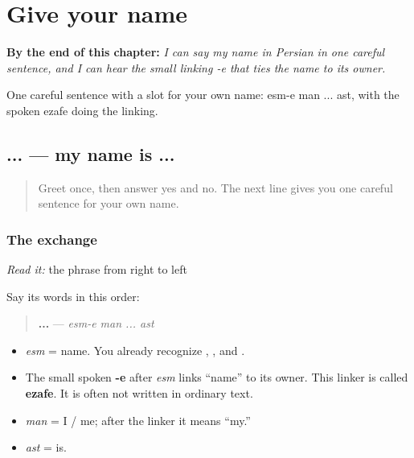 
\chapter{Give your name}
\label{ch:persian-name}

\begin{chapteropening}
\textbf{By the end of this chapter:} \emph{I can say my name in Persian in one careful sentence, and I can hear the small linking -e that ties the name to its owner.}

One careful sentence with a slot for your own name: esm-e man ... ast, with the spoken ezafe doing the linking.
\end{chapteropening}

\section[\texorpdfstring{\fa{اسم} \fa{من} ... \fa{است} (esm-e man ... ast)}{اسم من ... است (esm-e man ... ast)}]{  ...  — my name is ...}

\label{lesson:FA-C02-esm-e-man}



\begin{quote}
Greet once, then answer yes and no. The next line gives you one careful sentence for your own name.
\end{quote}

\subsection*{The exchange}
\emph{Read it:} the phrase from right to left

Say its words in this order:

\begin{quote}
\textbf{  ... } — \emph{esm-e man ... ast}
\end{quote}

\begin{itemize}
\raggedright
  \item \textbf{} \emph{esm} = name. You already recognize \textbf{}, \textbf{}, and \textbf{}.
  \item The small spoken \textbf{-e} after \emph{esm} links “name” to its owner. This linker is called \textbf{ezafe}. It is often not written in ordinary text.
  \item \textbf{} \emph{man} = I / me; after the linker it means “my.”
  \item \textbf{} \emph{ast} = is.
\end{itemize}

